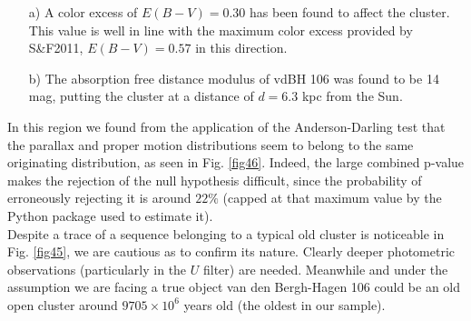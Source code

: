 \documentclass[draft]{aa}
\begin{document}
\begin{itemize}
\item [a)] A color excess of $E(B-V) = 0.30$ has been found to affect the
cluster. This value is well in line with the maximum color excess provided
by S\&F2011, $E(B-V) = 0.57$ in this direction.
\item [b)] The absorption free distance modulus of vdBH 106 was found to be
14 mag, putting the cluster at a distance of $d=6.3$ kpc from the Sun.
\end{itemize}

In this region we found from the application of the Anderson-Darling test that
the parallax and proper motion distributions seem to belong to the same
originating distribution, as seen in Fig. \ref{fig46}. Indeed, the
large combined p-value makes the rejection of the null hypothesis difficult,
since the probability of erroneously rejecting it is around $22\%$ (capped
at that maximum value by the Python package used to estimate it).\\

Despite a trace of a sequence belonging to a typical old cluster is
noticeable in Fig. \ref{fig45}, we are cautious as to confirm its nature.
Clearly deeper photometric observations (particularly in the $U$ filter) are
needed. Meanwhile and under the assumption we are facing a true object van
den Bergh-Hagen 106 could be an old open cluster around $9705\times10^6$ years
old (the oldest in our sample).
\end{document}
